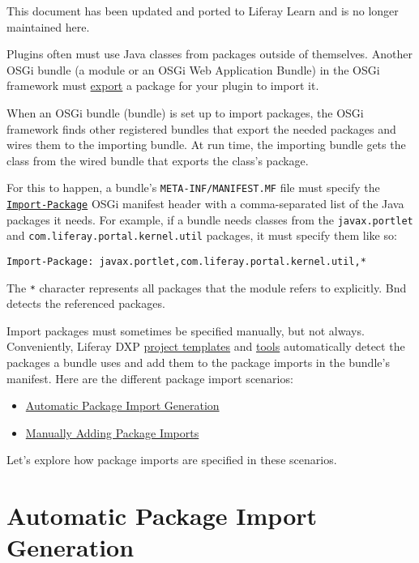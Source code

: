 { This document has been updated and ported to Liferay Learn and is no
longer maintained here.}

Plugins often must use Java classes from packages outside of themselves.
Another OSGi bundle (a module or an OSGi Web Application Bundle) in the
OSGi framework must
\href{/docs/7-2/customization/-/knowledge_base/c/exporting-packages}{export}
a package for your plugin to import it.

When an OSGi bundle (bundle) is set up to import packages, the OSGi
framework finds other registered bundles that export the needed packages
and wires them to the importing bundle. At run time, the importing
bundle gets the class from the wired bundle that exports the class's
package.

For this to happen, a bundle's \texttt{META-INF/MANIFEST.MF} file must
specify the
\href{https://bnd.bndtools.org/heads/import_package.html}{\texttt{Import-Package}}
OSGi manifest header with a comma-separated list of the Java packages it
needs. For example, if a bundle needs classes from the
\texttt{javax.portlet} and \texttt{com.liferay.portal.kernel.util}
packages, it must specify them like so:

\begin{verbatim}
Import-Package: javax.portlet,com.liferay.portal.kernel.util,*
\end{verbatim}

The \texttt{*} character represents all packages that the module refers
to explicitly. Bnd detects the referenced packages.

Import packages must sometimes be specified manually, but not always.
Conveniently, Liferay DXP
\href{/docs/7-2/reference/-/knowledge_base/r/project-templates}{project
templates} and
\href{/docs/7-2/reference/-/knowledge_base/r/tooling}{tools}
automatically detect the packages a bundle uses and add them to the
package imports in the bundle's manifest. Here are the different package
import scenarios:

\begin{itemize}
\item
  \hyperref[automatic-package-import-generation]{Automatic Package
  Import Generation}
\item
  \hyperref[manually-adding-package-imports]{Manually Adding Package
  Imports}
\end{itemize}

Let's explore how package imports are specified in these scenarios.

\section{Automatic Package Import
Generation}\label{automatic-package-import-generation}

